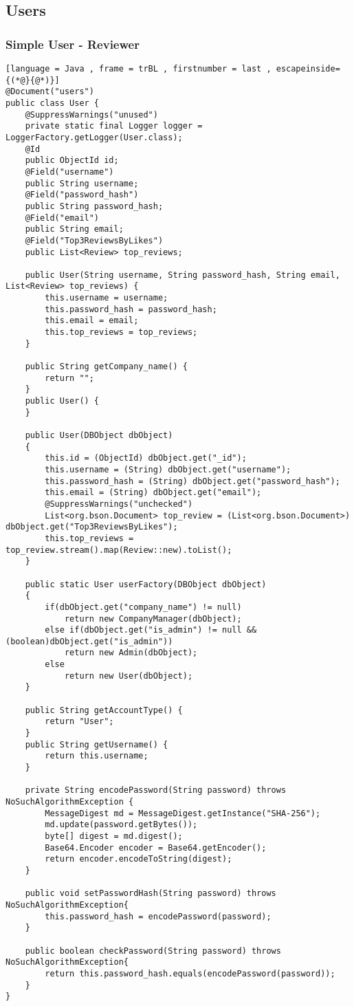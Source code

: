 \subsection{Users}
\subsubsection{Simple User - Reviewer}
\begin{lstlisting}[language = Java , frame = trBL , firstnumber = last , escapeinside={(*@}{@*)}]
@Document("users")
public class User {
    @SuppressWarnings("unused")
    private static final Logger logger = LoggerFactory.getLogger(User.class);
    @Id
    public ObjectId id;
    @Field("username")
    public String username;
    @Field("password_hash")
    public String password_hash;
    @Field("email")
    public String email;
    @Field("Top3ReviewsByLikes")
    public List<Review> top_reviews;

    public User(String username, String password_hash, String email, List<Review> top_reviews) {
        this.username = username;
        this.password_hash = password_hash;
        this.email = email;
        this.top_reviews = top_reviews;
    }

    public String getCompany_name() {
        return "";
    }
    public User() {
    }

    public User(DBObject dbObject)
    {
        this.id = (ObjectId) dbObject.get("_id");
        this.username = (String) dbObject.get("username");
        this.password_hash = (String) dbObject.get("password_hash");
        this.email = (String) dbObject.get("email");
        @SuppressWarnings("unchecked")
        List<org.bson.Document> top_review = (List<org.bson.Document>) dbObject.get("Top3ReviewsByLikes");
        this.top_reviews = top_review.stream().map(Review::new).toList();
    }

    public static User userFactory(DBObject dbObject)
    { 
        if(dbObject.get("company_name") != null)
            return new CompanyManager(dbObject);
        else if(dbObject.get("is_admin") != null && (boolean)dbObject.get("is_admin"))
            return new Admin(dbObject);
        else
            return new User(dbObject);
    }

    public String getAccountType() {
        return "User";
    }
    public String getUsername() {
        return this.username;
    }

    private String encodePassword(String password) throws NoSuchAlgorithmException {
        MessageDigest md = MessageDigest.getInstance("SHA-256");
        md.update(password.getBytes());
        byte[] digest = md.digest();
        Base64.Encoder encoder = Base64.getEncoder();
        return encoder.encodeToString(digest);
    }

    public void setPasswordHash(String password) throws NoSuchAlgorithmException{
        this.password_hash = encodePassword(password);
    }

    public boolean checkPassword(String password) throws NoSuchAlgorithmException{
        return this.password_hash.equals(encodePassword(password));
    }
}
\end{lstlisting}
